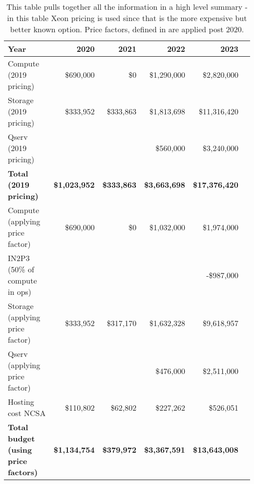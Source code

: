 \tiny \begin{longtable} { |p{}  |r  |r  |r  |r  |r |} 
\caption{This table pulls together all the information in a high level summary - in this table Xeon pricing is used since that is the more expensive but better known option. Price factors, defined in  are applied post 2020.
 \label{tab:Summary}}\\ 
\hline 
\textbf{Year}&\textbf{2020}&\textbf{2021}&\textbf{2022}&\textbf{2023} \\ \hline
{Compute (2019 pricing)}&{\$690,000}&{\$0}&{\$1,290,000}&{\$2,820,000} \\ \hline
{Storage (2019 pricing)}&{\$333,952}&{\$333,863}&{\$1,813,698}&{\$11,316,420} \\ \hline
{Qserv (2019 pricing)}&{}&{}&{\$560,000}&{\$3,240,000} \\ \hline
\textbf{Total (2019 pricing)}&\textbf{\$1,023,952}&\textbf{\$333,863}&\textbf{\$3,663,698}&\textbf{\$17,376,420} \\ \hline
{Compute (applying price factor)}&{\$690,000}&{\$0}&{\$1,032,000}&{\$1,974,000} \\ \hline
{IN2P3 (50\% of compute in ops)}&{}&{}&{}&{-\$987,000} \\ \hline
{Storage (applying price factor)}&{\$333,952}&{\$317,170}&{\$1,632,328}&{\$9,618,957} \\ \hline
{Qserv (applying price factor)}&{}&{}&{\$476,000}&{\$2,511,000} \\ \hline
{Hosting cost NCSA
}&{\$110,802}&{\$62,802}&{\$227,262}&{\$526,051} \\ \hline
\textbf{Total budget (using price factors)}&\textbf{\$1,134,754}&\textbf{\$379,972}&\textbf{\$3,367,591}&\textbf{\$13,643,008} \\ \hline
\end{longtable} \normalsize
